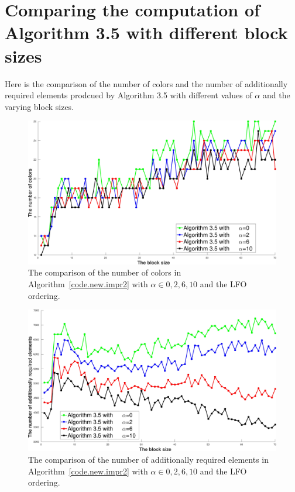 \documentclass[12pt, twoside,a4paper,toc=bibliography]{scrbook}
\newcommand{\coderef}[1]{Algorithm~\protect\ref{#1}}
\begin{document}
\clearpage
\section{Comparing the computation of Algorithm 3.5 with different block sizes}
\label{app.compare.alg35.alphas}
Here is the comparison of the number of colors and the number of additionally required elements
prodcued by Algorithm 3.5 with different values of $\alpha$ and the varying block sizes.

\begin{figure}
\centering
\includegraphics[width=0.9\linewidth]{ex33_alg35_alpha_0_2_6_10_bls_lfo_cols}
\caption{
The comparison of the number of colors in \coderef{code.new.impr2}
with $\alpha\in{0,2,6,10}$ and the LFO ordering.}
\label{ex33_alg35_alpha_0_2_6_10_bls_lfo_cols}
\end{figure}

\begin{figure}
\centering
\includegraphics[width=0.9\linewidth]{ex33_alg35_alpha_0_2_6_10_bls_lfo_adds}
\caption{
The comparison of the number of additionally required elements in \coderef{code.new.impr2}
with $\alpha\in{0,2,6,10}$ and the LFO ordering. }
\label{ex33_alg35_alpha_0_2_6_10_bls_lfo_adds}
\end{figure}
\end{document}
